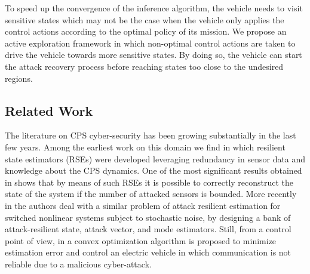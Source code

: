 \documentclass[letterpaper, 10 pt, conference]{ieeeconf}  %
\newcommand\NB[1]{$\spadesuit$\footnote{NB: #1}}
\begin{document}
To speed up the convergence of the inference algorithm, the vehicle needs to visit sensitive states which may not be the case when the vehicle only applies the control actions according to the optimal policy of its mission. We propose an active exploration framework in which non-optimal control actions are taken to drive the vehicle towards more sensitive states. By doing so, the vehicle can start the attack recovery process before reaching states too close to the undesired regions.%


\subsection{Related Work}\label{subsec:related}

The literature on CPS cyber-security has been growing substantially in the last few years. 
Among the earliest work on this domain we find \cite{fawzi2014secure, ivanov2014attack, pajic2014robustness, bezzo2014attack} in which resilient state estimators (RSEs) were developed leveraging redundancy in sensor data and knowledge about the CPS dynamics. One of the most significant results obtained in \cite{fawzi2014secure, pajic2014robustness} shows that by means of such RSEs it is possible to correctly reconstruct the state of the system if the number of attacked sensors is bounded.
More recently in \cite{kim2017attack} the authors deal with a similar problem of attack resilient estimation for switched nonlinear systems subject to stochastic noise, by designing a bank of attack-resilient state, attack vector, and mode estimators. Still, from a control point of view, in \cite{rana2017attack} a convex optimization algorithm is proposed to minimize estimation error and control an electric vehicle in which communication is not reliable due to a malicious cyber-attack.
\end{document}
